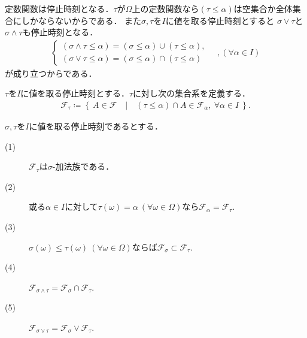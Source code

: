	定数関数は停止時刻となる．$\tau$が$\Omega$上の定数関数なら$(\tau \leq \alpha)$は空集合か全体集合にしかならないからである．
	また$\sigma,\tau$を$I$に値を取る停止時刻とすると
	$\sigma \vee \tau$と$\sigma \wedge \tau$も停止時刻となる．
	\begin{align}
		\begin{cases}
			(\sigma \wedge \tau \leq \alpha) = (\sigma \leq \alpha) \cup (\tau \leq \alpha), \\
			(\sigma \vee \tau \leq \alpha) = (\sigma \leq \alpha) \cap (\tau \leq \alpha)
		\end{cases}
		\quad ,(\forall \alpha \in I)
	\end{align}
	が成り立つからである．
	
	\begin{itembox}[l]{}
		\begin{dfn}[停止時刻の前に決まっている事象系]
			$\tau$を$I$に値を取る停止時刻とする．$\tau$に対し次の集合系を定義する．
			\begin{align}
				\mathcal{F}_\tau \coloneqq \left\{\ A \in \mathcal{F}\quad |\quad (\tau \leq \alpha) \cap A \in \mathcal{F}_\alpha,\ \forall \alpha \in I\ \right\}.
			\end{align}
		\end{dfn}
	\end{itembox}
	\begin{itembox}[l]{}
		\begin{prp}[停止時刻の性質]
			$\sigma, \tau$を$I$に値を取る停止時刻であるとする．
			\begin{description}
				\item[(1)] $\mathcal{F}_\tau$は$\sigma$-加法族である．
				\item[(2)] 或る$\alpha \in I$に対して$\tau(\omega) = \alpha\ (\forall \omega \in \Omega)$なら$\mathcal{F}_\alpha = \mathcal{F}_\tau$.
				\item[(3)] $\sigma(\omega) \leq \tau(\omega)\ (\forall \omega \in \Omega)$ならば$\mathcal{F}_\sigma \subset \mathcal{F}_\tau$.
				\item[(4)] $\mathcal{F}_{\sigma \wedge \tau} = \mathcal{F}_\sigma \cap \mathcal{F}_\tau$.
				\item[(5)] $\mathcal{F}_{\sigma \vee \tau} = \mathcal{F}_\sigma \vee \mathcal{F}_\tau$.
			\end{description}
		\end{prp}
	\end{itembox}
	
